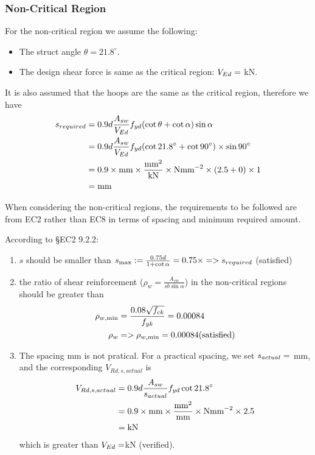 \subsubsection{Non-Critical Region}
For the non-critical region we assume the following:
\begin{itemize}
\item The struct angle $\theta = 21.8^{\circ}$.
\item The design shear force is same as the critical region: $V_{Ed} =
  \g{VEd}$ kN.
\end{itemize}
It is also assumed that the hoops are the same as the critical region, therefore
we have
\begin{align*}
                 s_{required} &= 0.9d \frac{A_{sw}}{V_{Ed}} f_{yd}
                                (\cot \theta + \cot \alpha)\sin \alpha \\
                              &= 0.9d \frac{A_{sw}}{V_{Ed}} f_{yd} (\cot 21.8^{\circ} +
                                \cot 90 ^{\circ}) \times \sin 90^{\circ}\\
               &= 0.9 \times \g{d} \mbox{mm}
                 \times
                 \frac{\g{Asw}\mbox{mm}^{2}}{\g{VEd} \mbox{kN}}
                 \times \g{fyd} \mbox{Nmm}^{-2}  \times (2.5 + 0) \times 1\\
               &= \g{sreqn} \mbox{mm}
\end{align*}

When considering the non-critical regions, the requirements to be followed are
from EC2 rather than EC8 in terms of spacing and minimum required amount.

According to \S EC2 9.2.2:
\begin{enumerate}
\item $s$ should be smaller than $s_{\max} := \frac{0.75d}{1+\cot\alpha} =
  0.75 \times \g{d} = \g{smaxn} > s_{required}$ (satisfied)
\item the ratio of shear reinforcement ($\rho_w = \frac{A_{sw}}{sb \sin
    \alpha}$) in the non-critical regions should be greater than
\begin{align*}
  \rho_{w,\min} &= \frac{0.08 \sqrt{f_{ck}}}{f_{yk}} = 0.00084 \\
  \rho_w &= \g{rho} > \rho_{w,\min} = 0.00084 \mbox{(satisfied)}
\end{align*}
\item The spacing  mm is not pratical. For a practical spacing, we
  set $s_{actual} = \g{sactn}$ mm, and the corresponding $V_{Rd, s, actual}$
  is
\begin{align*}
  V_{Rd, s, actual} &= 0.9d \frac{A_{sw}}{s_{actual}}f_{yd}\cot  21.8 ^{\circ} \\
                    &= 0.9 \times \g{d} \mbox{mm} \times \frac{\g{Asw}
                      \mbox{mm}^{2}}{\g{sactn} \mbox{mm}}
                      \times \g{fyd} \mbox{Nmm}^{-2} \times 2.5 \\
                    &= \g{VRdsActn} \mbox{kN}
\end{align*}
  which is greater than $V_{Ed} = \g{VEd}$kN (verified).
\end{enumerate}